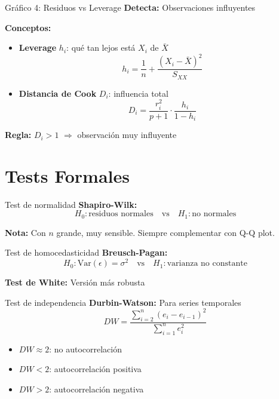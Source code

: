 \documentclass[aspectratio=169]{beamer}
\begin{document}
\begin{frame}{Gráfico 4: Residuos vs Leverage}
\textbf{Detecta:} Observaciones influyentes

\vspace{0.3cm}
\textbf{Conceptos:}
\begin{itemize}
    \item \textbf{Leverage} $h_i$: qué tan lejos está $X_i$ de $\bar{X}$
    \[
    h_i = \frac{1}{n} + \frac{(X_i - \bar{X})^2}{S_{XX}}
    \]
    \item \textbf{Distancia de Cook} $D_i$: influencia total
    \[
    D_i = \frac{r_i^2}{p+1} \cdot \frac{h_i}{1-h_i}
    \]
\end{itemize}

\vspace{0.3cm}
\textbf{Regla:} $D_i > 1$ $\Rightarrow$ observación muy influyente
\end{frame}

\section{Tests Formales}

\begin{frame}{Test de normalidad}
\textbf{Shapiro-Wilk:}
\[
H_0: \text{residuos normales} \quad \text{vs} \quad H_1: \text{no normales}
\]

\vspace{0.5cm}
\textbf{Nota:} Con $n$ grande, muy sensible. Siempre complementar con Q-Q plot.
\end{frame}

\begin{frame}{Test de homocedasticidad}
\textbf{Breusch-Pagan:}
\[
H_0: \text{Var}(\epsilon) = \sigma^2 \quad \text{vs} \quad H_1: \text{varianza no constante}
\]

\vspace{0.5cm}
\textbf{Test de White:} Versión más robusta
\end{frame}

\begin{frame}{Test de independencia}
\textbf{Durbin-Watson:} Para series temporales
\[
DW = \frac{\sum_{i=2}^{n}(e_i - e_{i-1})^2}{\sum_{i=1}^{n} e_i^2}
\]

\begin{itemize}
    \item $DW \approx 2$: no autocorrelación
    \item $DW < 2$: autocorrelación positiva
    \item $DW > 2$: autocorrelación negativa
\end{itemize}
\end{frame}
\end{document}
